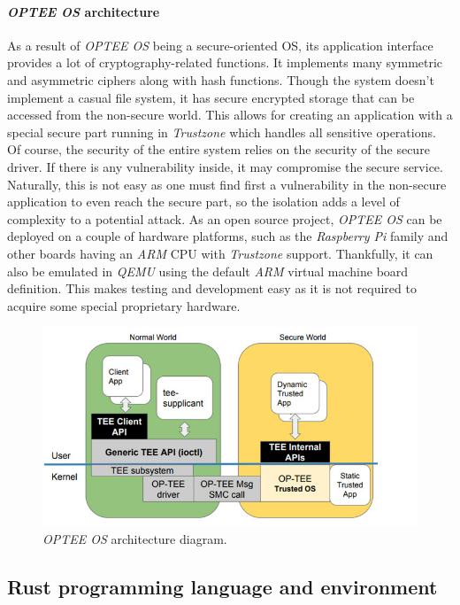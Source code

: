 \paragraph{\textit{OPTEE OS} architecture}
As a result of \textit{OPTEE OS} being a secure-oriented OS, its application interface provides a lot of cryptography-related functions. It implements many symmetric and asymmetric ciphers along with hash functions. Though the system doesn't implement a casual file system, it has secure encrypted storage that can be accessed from the non-secure world. This allows for creating an application with a special secure part running in \textit{Trustzone} which handles all sensitive operations. Of course, the security of the entire system relies on the security of the secure driver. If there is any vulnerability inside, it may compromise the secure service. Naturally, this is not easy as one must find first a vulnerability in the non-secure application to even reach the secure part, so the isolation adds a level of complexity to a potential attack. As an open source project, \textit{OPTEE OS} can be deployed on a couple of hardware platforms, such as the \textit{Raspberry Pi} family and other boards having an \textit{ARM} CPU with \textit{Trustzone} support. Thankfully, it can also be emulated in \textit{QEMU} using the default \textit{ARM} virtual machine board definition. This makes testing and development easy as it is not required to acquire some special proprietary hardware.

\begin{figure}[h!]
    \centering
    \includegraphics[width=.8\linewidth]{tex/img/op-tee-software-architecture.jpg}
    \caption{\textit{OPTEE OS} architecture diagram.}
    \label{fig:optee}
\end{figure}


\subsection{Rust programming language and environment}

